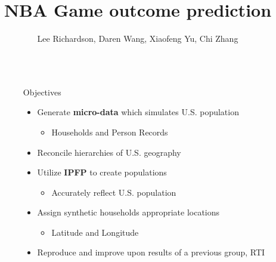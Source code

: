 \documentclass[final]{beamer}
\title{NBA Game outcome prediction}%
\author{Lee Richardson, Daren Wang, Xiaofeng Yu, Chi Zhang} %
\institute{Carnegie Mellon University} %
\newlength{\sepwid}
\newlength{\onecolwid}
\begin{document}

\setlength{\belowcaptionskip}{2ex} %
\setlength\belowdisplayshortskip{2ex} %

\begin{frame}[t] %

\begin{columns}[t] %

\begin{column}{\sepwid}\end{column} %

\begin{column}{\onecolwid} %


\begin{alertblock}{Objectives}

\begin{itemize}
\item Generate \textbf{micro-data} which simulates U.S. population
\begin{itemize}

\item Households and Person Records
\end{itemize}
\item Reconcile hierarchies of U.S. geography
\item Utilize \textbf{IPFP} to create populations
\begin{itemize}
\item Accurately reflect U.S. population
\end{itemize}
\item Assign synthetic households appropriate locations
\begin{itemize}
\item Latitude and Longitude
\end{itemize}
\item Reproduce and improve upon results of a previous group, RTI
\end{itemize}


\end{alertblock}
\end{column}
\end{columns}
\end{frame}
\end{document}
